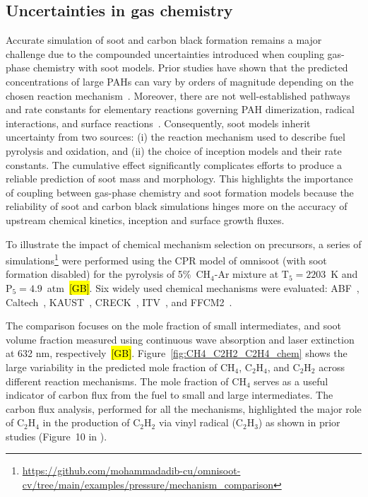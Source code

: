 \subsection{Uncertainties in gas chemistry}
\label{sec:uncergaschem}
Accurate simulation of soot and carbon black formation remains a major challenge due to the compounded uncertainties introduced when coupling gas-phase chemistry with soot models. Prior studies have shown that the predicted concentrations of large PAHs can vary by orders of magnitude depending on the chosen reaction mechanism~\citep{wang2023systematic}. Moreover, there are not well-established pathways and rate constants for elementary reactions governing PAH dimerization, radical interactions, and surface reactions~\citep{martin2022soot}. Consequently, soot models inherit uncertainty from two sources: (i) the reaction mechanism used to describe fuel pyrolysis and oxidation, and (ii) the choice of inception models and their rate constants. The cumulative effect significantly complicates efforts to produce a reliable prediction of soot mass and morphology. This highlights the importance of coupling between gas-phase chemistry and soot formation models because the reliability of soot and carbon black simulations hinges more on the accuracy of upstream chemical kinetics, inception and surface growth fluxes.

To illustrate the impact of chemical mechanism selection on precursors, a series of simulations\footnote{\href{https://github.com/mohammadadib-cu/omnisoot-cv/tree/main/examples/pressure/mechanism_comparison}{https://github.com/mohammadadib-cu/omnisoot-cv/tree/main/examples/pressure/mechanism\_comparison}} were performed using the CPR model of omnisoot (with soot formation disabled) for the pyrolysis of 5\%~$\mathrm{CH_4}$-Ar mixture at $\mathrm{T_5}=2203$~K and $\mathrm{P_5}=4.9$~atm~\hl{[GB]}. Six widely used chemical mechanisms were evaluated: ABF~\citep{appel2000kinetic}, Caltech~\citep{blanquart2009chemical}, KAUST~\citep{wang2013pah}, CRECK~\citep{saggese2015kinetic}, ITV~\citep{hellmuth2024role}, and FFCM2~\citep{ZDV2023}.

The comparison focuses on the mole fraction of small intermediates, and soot volume fraction measured using continuous wave absorption and laser extinction at 632 nm, respectively~\hl{[GB]}. Figure~\ref{fig:CH4_C2H2_C2H4_chem} shows the large variability in the predicted mole fraction of $\mathrm{CH_4}$, $\mathrm{C_2H_4}$, and $\mathrm{C_2H_2}$ across different reaction mechanisms. The mole fraction of $\mathrm{CH_4}$ serves as a useful indicator of carbon flux from the fuel to small and large intermediates. The carbon flux analysis, performed for all the mechanisms, highlighted the major role of $\mathrm{C_2H_4}$ in the production of $\mathrm{C_2H_2}$ via vinyl radical ($\mathrm{C_2H_3}$) as shown in prior studies (Figure~10 in \citep{wang2023systematic}). 

